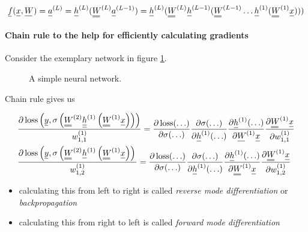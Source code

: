 \begin{equation}
    \vec{f}(\vec{x}, \vec{W}) = \vec{a}^{(L)} = \vec{h}^{(L)}(\mat{W}^{(L)} \vec{a}^{(L-1)}) = \vec{h}^{(L)}(\mat{W}^{(L)} \vec{h}^{(L-1)}(\mat{W}^{(L-1)} \dots \vec{h}^{(1)}(\mat{W}^{(1)} \vec{x})))
\end{equation}

\paragraph*{Chain rule to the help for efficiently calculating gradients} Consider the
exemplary network in figure \ref{fig:nn_simple}.

\begin{figure}[!htb]
    \centering
    
    \caption{A simple neural network.}
    \label{fig:nn_simple}
\end{figure}


Chain rule gives us

\begin{equation}
    \begin{aligned}
    & \frac{\partial \operatorname{loss}\left(\vec{y}, \sigma\left(\mat{W}^{(2)} \vec{\vec{h}}^{(1)}\left(\mat{W}^{(1)} \vec{x}\right)\right)\right)}{w_{1,1}^{(1)}}=\frac{\partial \operatorname{loss}(\ldots)}{\partial \sigma(\ldots)} \frac{\partial \sigma(\ldots)}{\partial \vec{h}^{(1)}(\ldots)} \frac{\partial \vec{h}^{(1)}(\ldots)}{\partial \vec{W}^{(1)} \vec{x}} \frac{\partial \mat{W}^{(1)} \vec{x}}{\partial w_{1,1}^{(1)}} \\
    & \frac{\partial \operatorname{loss}\left(\vec{y}, \sigma\left(\mat{W}^{(2)} \vec{h}^{(1)}\left(\mat{W}^{(1)} \vec{x}\right)\right)\right.}{w_{1,2}^{(1)}}=\frac{\partial \operatorname{loss}(\ldots)}{\partial \sigma(\ldots)} \frac{\partial \sigma(\ldots)}{\partial \vec{h}^{(1)}(\ldots)} \frac{\partial \vec{h}^{(1)}(\ldots)}{\partial \mat{W}^{(1)} \vec{x}} \frac{\partial \mat{W}^{(1)} \vec{x}}{\partial w_{1,2}^{(1)}}
    \end{aligned}
\end{equation}

\begin{itemize}
    \item calculating this from left to right is called \textit{reverse mode differentiation} or \textit{backpropagation}
    \item calculating this from right to left is called \textit{forward mode differentiation}
\end{itemize}

